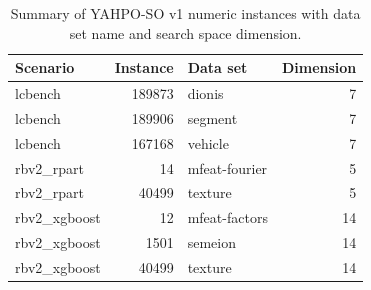 \begin{table}[H]
  \centering
  \caption{Summary of YAHPO-SO v1 numeric instances with data set name and search space dimension.}
  \label{tab:numeric_instances}
  \begin{tabular}{lrlr}
    \toprule
    Scenario      & Instance & Data set      & Dimension \\
    \midrule
    lcbench       & 189873   & dionis        & 7         \\
    lcbench       & 189906   & segment       & 7         \\
    lcbench       & 167168   & vehicle       & 7         \\
    rbv2\_rpart   & 14       & mfeat-fourier & 5         \\
    rbv2\_rpart   & 40499    & texture       & 5         \\
    rbv2\_xgboost & 12       & mfeat-factors & 14        \\
    rbv2\_xgboost & 1501     & semeion       & 14        \\
    rbv2\_xgboost & 40499    & texture       & 14        \\
    \bottomrule
  \end{tabular}
\end{table}